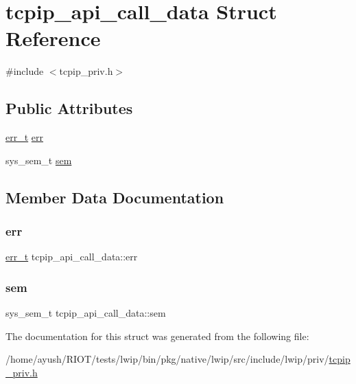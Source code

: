 \hypertarget{structtcpip__api__call__data}{}\section{tcpip\+\_\+api\+\_\+call\+\_\+data Struct Reference}
\label{structtcpip__api__call__data}


{\ttfamily \#include $<$tcpip\+\_\+priv.\+h$>$}

\subsection*{Public Attributes}
\begin{DoxyCompactItemize}
\item 
\hyperlink{group__infrastructure__errors_gaf02d9da80fd66b4f986d2c53d7231ddb}{err\+\_\+t} \hyperlink{structtcpip__api__call__data_a1a1d5bb2f7fd09f592fb56089e762307}{err}
\item 
sys\+\_\+sem\+\_\+t \hyperlink{structtcpip__api__call__data_a430b64d7617893939ed12cc957765431}{sem}
\end{DoxyCompactItemize}


\subsection{Member Data Documentation}
\mbox{\label{structtcpip__api__call__data_a1a1d5bb2f7fd09f592fb56089e762307}} 
\subsubsection{\texorpdfstring{err}{err}}
{\footnotesize\ttfamily \hyperlink{group__infrastructure__errors_gaf02d9da80fd66b4f986d2c53d7231ddb}{err\+\_\+t} tcpip\+\_\+api\+\_\+call\+\_\+data\+::err}

\mbox{\label{structtcpip__api__call__data_a430b64d7617893939ed12cc957765431}} 
\subsubsection{\texorpdfstring{sem}{sem}}
{\footnotesize\ttfamily sys\+\_\+sem\+\_\+t tcpip\+\_\+api\+\_\+call\+\_\+data\+::sem}



The documentation for this struct was generated from the following file\+:\begin{DoxyCompactItemize}
\item 
/home/ayush/\+R\+I\+O\+T/tests/lwip/bin/pkg/native/lwip/src/include/lwip/priv/\hyperlink{native_2lwip_2src_2include_2lwip_2priv_2tcpip__priv_8h}{tcpip\+\_\+priv.\+h}\end{DoxyCompactItemize}
